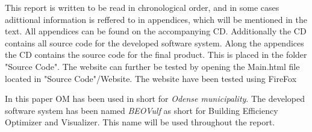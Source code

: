This report is written to be read in chronological order, and in some cases adittional information is reffered to in appendices, which will be mentioned in the text. All appendices can be found on the accompanying CD. Additionally the CD contains all source code for the developed software system.
Along the appendices the CD contains the source code for the final product. This is placed in the folder "Source Code". The website can further be tested by opening the Main.html file located in "Source Code"/Website. The website have been tested using FireFox

In this paper OM has been used in short for \emph{Odense municipality}. The developed software system has been named \emph{BEOVulf} as short for Building Efficiency Optimizer and Visualizer. This name will be used throughout the report.

